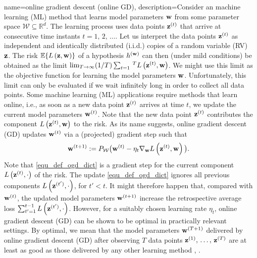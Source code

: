 {
{name={online gradient descent (online GD)}, 
	description={Consider  an machine learning (ML) method that learns model parameters 
		${\bf w}$ from some parameter space $\mathcal{W} \subseteq \mathbb{R}^{d}$. 
		The learning process uses data points ${\bf z}^{(t)}$ that arrive at consecutive time instants $t=1, \,2, \,\dots$. 
		Let us interpret the data points ${\bf z}^{(t)}$ as independent and identically distributed (i.i.d.) copies 
		of a random variable (RV) ${\bf z}$. The risk $\mathbb{E} \{ L\left({\bf z},{\bf w} \right) \}$ of a 
		hypothesis $h^{({\bf w})}$ can then (under mild conditions) be obtained as the limit 
		$\lim_{T\rightarrow \infty} (1/T)\sum_{t=1}\,^{T} L\left({\bf z}^{(t)},{\bf w} \right)$. 
		We might use this limit as the objective function for learning the model parameters ${\bf w}$. 
		Unfortunately, this limit can only be evaluated if we wait infinitely long in order to collect all data points. 
		Some machine learning (ML) applications require methods that learn online, i.e., as soon as a new data point ${\bf z}^{(t)}$ 
		arrives at time $t$, we update the current model parameters ${\bf w}^{(t)}$. Note that 
		the new data point ${\bf z}^{(t)}$ contributes the component $L\left({\bf z}^{(t)},{\bf w} \right)$ 
		to the risk. As its name suggests, online gradient descent (GD) updates ${\bf w}^{(t)}$ via a (projected) gradient step such that
		\begin{equation} 
			\label{equ_def_ogd_dict}
 			{\bf w}^{(t+1)} := P_{\mathcal{W}}\big( {\bf w}^{(t)} - \eta_{t} \nabla_{{\bf w}} L\left({\bf z}^{(t)},{\bf w} \right)\big) . 
		\end{equation} 
		Note that \eqref{equ_def_ogd_dict} is a gradient step for the current component $L\left({\bf z}^{(t)},\cdot \right)$ 
		of the risk. The update \eqref{equ_def_ogd_dict} ignores all previous components $L\left({\bf z}^{(t')},\cdot \right)$, 
		for $t' < t$. It might therefore happen that, compared with ${\bf w}^{(t)}$, the updated model parameters 
		${\bf w}^{(t+1)}$ increase the retrospective average loss $\sum_{t'=1}^{t-1} L\left({\bf z}^{(t')},\cdot \right)$. 
		However, for a suitably chosen learning rate $\eta_{t}$, online gradient descent (GD) can be shown 
		to be optimal in practically relevant settings. By optimal, we mean that the model parameters 
		${\bf w}^{(T+1)}$ delivered by online gradient descent (GD) after observing $T$ data points ${\bf z}^{(1)}, \,\ldots, \,{\bf z}^{(T)}$ 
		are at least as good as those delivered by any other learning method \cite{HazanOCO}, \cite{GDOptimalRakhlin2012}. 
}}}

